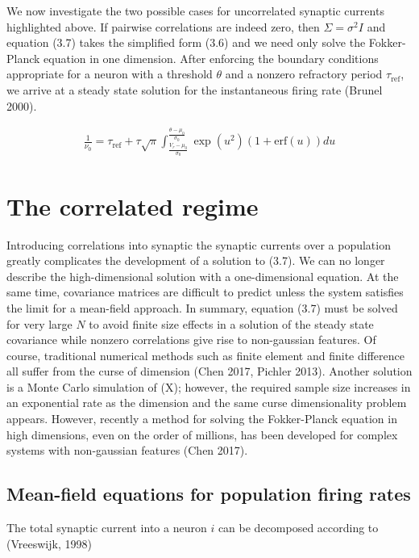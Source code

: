 \documentclass{ucetd}
\begin{document}
We now investigate the two possible cases for uncorrelated synaptic currents highlighted above. If pairwise correlations are indeed zero, then $\Sigma = \sigma^{2}I$ and equation (3.7) takes the simplified form (3.6) and we need only solve the Fokker-Planck equation in one dimension. After enforcing the boundary conditions appropriate for a neuron with a threshold $\theta$ and a nonzero refractory period $\tau_{\mathrm{ref}}$, we arrive at a steady state solution for the instantaneous firing rate (Brunel 2000). 

\begin{align}
\frac{1}{\nu_{0}} = \tau_{\mathrm{ref}} + \tau\sqrt{\pi}\int_{\frac{V_{r}-\mu_{0}}{\sigma_{0}}}^{\frac{\theta-\mu_{0}}{\sigma_{0}}} \exp(u^{2})(1+\mathrm{erf}(u))du
\end{align}

\section{The correlated regime}

Introducing correlations into synaptic the synaptic currents over a population greatly complicates the development of a solution to (3.7). We can no longer describe the high-dimensional solution with a one-dimensional equation. At the same time, covariance matrices are difficult to predict unless the system satisfies the limit for a mean-field approach. In summary, equation (3.7) must be solved for very large $N$ to avoid finite size effects in a solution of the steady state covariance while nonzero correlations give rise to non-gaussian features.  Of course, traditional numerical methods such as finite element and finite difference all suffer from the curse of dimension (Chen 2017, Pichler 2013). Another solution is a Monte Carlo simulation of (X); however, the required sample size increases in an exponential rate as the dimension and the same curse dimensionality problem appears. However, recently a method for solving the Fokker-Planck equation in high dimensions, even on the order of millions, has been developed for complex systems with non-gaussian features (Chen 2017). 

\subsection{Mean-field equations for population firing rates}

The total synaptic current into a neuron $i$ can be decomposed according to (Vreeswijk, 1998)
\end{document}
